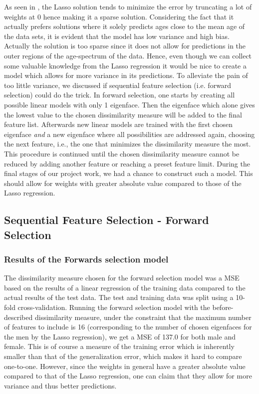 As seen in , the Lasso solution tends to minimize the error by truncating a lot of weights at 0 hence making it a sparse solution. Considering the fact that it actually prefers solutions where it solely predicts ages close to the mean age of the data sets, it is evident that the model has low variance and high bias. Actually the solution is too sparse since it does not allow for predictions in the outer regions of the age-spectrum of the data. Hence, even though we can collect some valuable knowledge from the Lasso regression it would be nice to create a model which allows for more variance in its predictions. 
To alleviate the pain of too little variance, we discussed if sequential feature selection (i.e. forward selection) could do the trick. In forward selection, one starts by creating all possible linear models with only 1 eigenface. Then the eigenface which alone gives the lowest value to the chosen dissimilarity measure will be added to the final feature list. Afterwards new linear models are trained with the first chosen eigenface \textit{and} a new eigenface where all possibilities are addressed again, choosing the next feature, i.e., the one that minimizes the dissimilarity measure the most. This procedure is continued until the chosen dissimilarity measure cannot be reduced by adding another feature or reaching a preset feature limit. During the final stages of our project work, we had a chance to construct such a model. This should allow for weights with greater absolute value compared to those of the Lasso regression.

\subsection{Sequential Feature Selection - Forward Selection}

\subsubsection{Results of the Forwards selection model}

The dissimilarity measure chosen for the forward selection model was a MSE based on the results of a linear regression of the training data compared to the actual results of the test data. The test and training data was split using a 10-fold cross-validation. Running the forward selection model with the before-described dissimilarity measure, under the constraint that the maximum number of features to include is 16 (corresponding to the number of chosen eigenfaces for the men by the Lasso regression), we get a MSE of 137.0 for both male and female. This is of course a measure of the training error which is inherently smaller than that of the generalization error, which makes it hard to compare one-to-one. However, since the weights in general have a greater absolute value compared to that of the Lasso regression, one can claim that they allow for more variance and thus better predictions.


